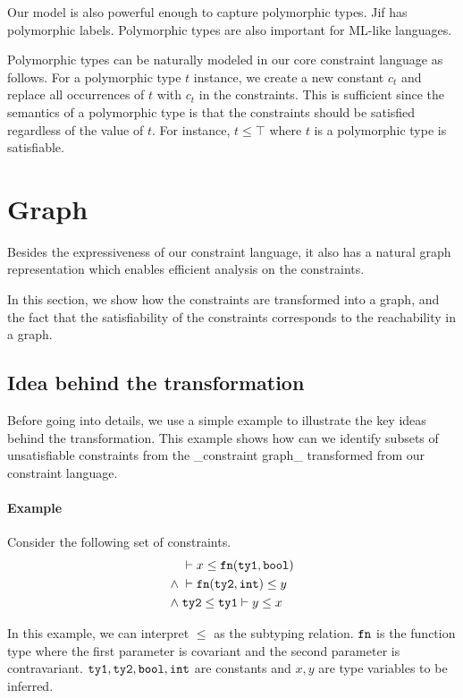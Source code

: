 Our model is also powerful enough to capture polymorphic types.  Jif
has polymorphic labels. Polymorphic types are also important for
ML-like languages.

Polymorphic types can be naturally modeled in our core constraint
language as follows. For a polymorphic type $t$ instance, we create a
new constant $c_t$ and replace all occurrences of $t$ with $c_t$ in
the constraints. This is sufficient since the semantics of a
polymorphic type is that the constraints should be satisfied
regardless of the value of $t$. For instance, $t\leq \top$ where $t$
is a polymorphic type is satisfiable.
\fi

\section{Graph} 
\label{sec:graph}

Besides the expressiveness of our constraint language, it also has a natural
graph representation which enables efficient analysis on the constraints.

In this section, we show how the constraints are transformed into a graph, and
the fact that the satisfiability of the constraints corresponds to the
reachability in a graph. 

\subsection{Idea behind the transformation}

Before going into details, we use a simple example to illustrate the key ideas
behind the transformation. This example shows how can we identify subsets of
unsatisfiable constraints from the _constraint graph_ transformed from our
constraint language.

\paragraph{Example} Consider the following set of constraints.
\begin{align*}
      &\; \vdash x \leq \mathtt{fn} (\mathtt{ty1}, \mathtt{bool}) \\
\land &\; \vdash \mathtt{fn} (\mathtt{ty2}, \mathtt{int}) \leq y \\
\land &\; \mathtt{ty2} \leq \mathtt{ty1} \vdash y \leq x
\end{align*}

In this example, we can interpret $\leq$ as the subtyping relation. $\mathtt{fn}$ is
the function type where the first parameter is covariant and the second
parameter is contravariant. $\mathtt{ty1}, \mathtt{ty2}, \mathtt{bool}, \mathtt{int}$ are
constants and $x,y$ are type variables to be inferred.

